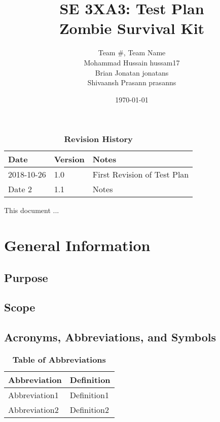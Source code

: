 \documentclass[12pt, titlepage]{article}
\title{SE 3XA3: Test Plan\\Zombie Survival Kit}
\author{Team \#, Team Name
		\\ Mohammad Hussain hussam17
		\\ Brian Jonatan jonatans
		\\ Shivaansh Prasann prasanns
}
\date{\today}
\begin{document}
\maketitle

\tableofcontents
\listoftables
\listoffigures

\begin{table}[bp]
\caption{\bf Revision History}
\begin{tabularx}{\textwidth}{p{3cm}p{2cm}X}
\toprule {\bf Date} & {\bf Version} & {\bf Notes}\\
\midrule
2018-10-26 & 1.0 & First Revision of Test Plan\\
Date 2 & 1.1 & Notes\\
\bottomrule
\end{tabularx}
\end{table}

\newpage


This document ...

\section{General Information}

\subsection{Purpose}

\subsection{Scope}

\subsection{Acronyms, Abbreviations, and Symbols}
	
\begin{table}[hbp]
\caption{\textbf{Table of Abbreviations}} \label{Table}

\begin{tabularx}{\textwidth}{p{3cm}X}
\toprule
\textbf{Abbreviation} & \textbf{Definition} \\
\midrule
Abbreviation1 & Definition1\\
Abbreviation2 & Definition2\\
\bottomrule
\end{tabularx}

\end{table}
\end{document}
